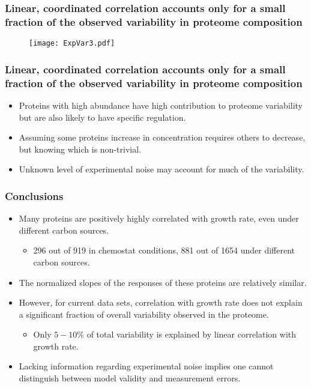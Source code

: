 \documentclass{beamer}
\begin{document}
\begin{frame}
\frametitle{Linear, coordinated correlation accounts only for a small fraction of the observed variability in proteome composition}
\begin{figure}[h!]
\centering
\texttt{[image: ExpVar3.pdf]}
\end{figure}
\end{frame}

\begin{frame}
\frametitle{Linear, coordinated correlation accounts only for a small fraction of the observed variability in proteome composition}
\begin{itemize}[<+->]
\item Proteins with high abundance have high contribution to proteome variability but are also likely to have specific regulation.
\item Assuming some proteins increase in concentration requires others to decrease, but knowing which is non-trivial.
\item Unknown level of experimental noise may account for much of the variability.
\end{itemize}
\end{frame}

\begin{frame}
\frametitle{Conclusions}
\begin{itemize}
\item Many proteins are positively highly correlated with growth rate, even under different carbon sources.
\begin{itemize}
\item 296 out of 919 in chemostat conditions, 881 out of 1654 under different carbon sources.
\end{itemize}
\item The normalized slopes of the responses of these proteins are relatively similar.
\item However, for current data sets, correlation with growth rate does not explain a significant fraction of overall variability observed in the proteome.
\begin{itemize}
\item Only $5-10\%$ of total variability is explained by linear correlation with growth rate.
\end{itemize}
\item Lacking information regarding experimental noise implies one cannot distinguish between model validity and measurement errors.
\end{itemize}
\end{frame}
\end{document}
